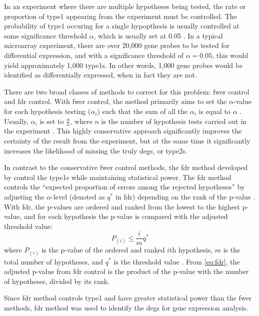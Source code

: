 In an experiment where there are multiple hypotheses being tested, the rate or proportion of \gls{type1} appearing from the experiment must be controlled.
The probability of \gls{type1} occuring for a single hypopthesis is usually controlled at some significance threshold $\alpha$, which is usually set at 0.05 \citep{Shaffer1995}.
In a typical microarray experiment, there are over 20,000 gene probes to be tested for differential expression, and with a significance threshold of $\alpha = 0.05$, this would yield approximately 1,000 \glspl{type1}.
In other words, 1,000 gene probes would be identified as differentially expressed, when in fact they are not.

There are two broad classes of methods to correct for this problem: \gls{fwer} control and \gls{fdr} control.
With \gls{fwer} control, the method primarily aims to set the $\alpha$-value for each hypothesis testing ($\alpha_i$) such that the sum of all the $\alpha_i$ is equal to $\alpha$ \citep{Hochberg1987,Shaffer1995}.
Usually, $\alpha_i$ is set to $\frac{\alpha}{n}$, where $n$ is the number of hypothesis tests carried out in the experiment \citep{Shaffer1995}.
This highly conservative approach significantly improves the certainty of the result from the experiment, but at the same time it significantly increases the likelihood of missing the truly \glspl{deg}, or \glspl{type2}.

In contrast to the conservative \gls{fwer} control methods, the \gls{fdr} method developed by \citet{Benjamini1995a} control the \glspl{type1} while maintaining statistical \gls{power}.
The \gls{fdr} method controls the ``expected proportion of errors among the rejected hypotheses'' by adjusting the $\alpha$-level (denoted as $q^*$ in \gls{fdr}) depending on the rank of the p-value \citep{Benjamini1995a}.
With \gls{fdr}, the p-values are ordered and ranked from the lowest to the highest p-value, and for each hypothesis the p-value is compared with the adjusted threshold value:
\begin{equation}
	\label{eq:fdr}
	P_{(i)} \leq \frac{i}{m}q^*
\end{equation}
where $P_{(i)}$ is the p-value of the ordered and ranked $i$th hypothesis, $m$ is the total number of hypotheses, and $q^*$ is the threshold value \citep{Benjamini1995a}.
From \cref{eq:fdr}, the adjusted p-value from \gls{fdr} control is the product of the p-value with the number of hypotheses, divided by its rank.

Since \gls{fdr} method controls \gls{type1} and have greater statistical \gls{power} than the \gls{fwer} methods, \gls{fdr} method was used to identify the \glspl{deg} for gene expression analysis.

